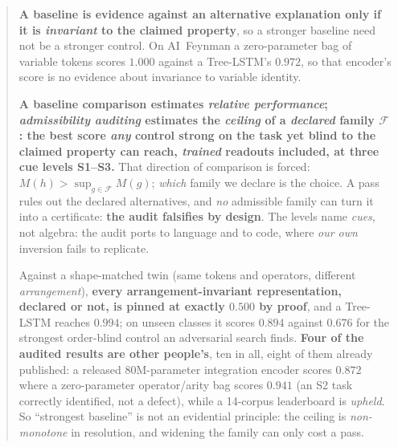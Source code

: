 \begin{abstract}
\textbf{A baseline is evidence against an alternative explanation only if it is \emph{invariant} to the claimed property}, so a stronger baseline need not be a stronger control. On AI~Feynman a zero-parameter bag of variable tokens scores $\mathbf{1.000}$ against a Tree-LSTM's $0.972$, so that encoder's score is no evidence about invariance to variable identity.

\textbf{A baseline comparison estimates \emph{relative performance}; \emph{admissibility auditing} estimates the \emph{ceiling} of a \emph{declared} family $\mathcal{F}$: the best score \emph{any} control strong on the task yet blind to the claimed property can reach, \emph{trained} readouts included, at three cue levels S1--S3.} That direction of comparison is forced: $M(h)>\sup\nolimits_{g\in\mathcal{F}}M(g)$; \emph{which} family we declare is the choice. A pass rules out the declared alternatives, and \emph{no} admissible family can turn it into a certificate: \textbf{the audit falsifies by design}. The levels name \emph{cues}, not algebra: the audit ports to language and to code, where \emph{our own} inversion fails to replicate.

Against a shape-matched twin (same tokens and operators, different \emph{arrangement}), \textbf{every arrangement-invariant representation, declared or not, is pinned at exactly $0.500$ by proof}, and a Tree-LSTM reaches $\mathbf{0.994}$; on unseen classes it scores $\mathbf{0.894}$ against $0.676$ for the strongest order-blind control an adversarial search finds. \textbf{Four of the audited results are other people's}, ten in all, eight of them already published: a released 80M-parameter integration encoder scores $0.872$ where a zero-parameter operator/arity bag scores $\mathbf{0.941}$ (an S2 task correctly identified, not a defect), while a 14-corpus leaderboard is \emph{upheld}. So ``strongest baseline'' is not an evidential principle: the ceiling is \emph{non-monotone} in resolution, and widening the family can only cost a pass.


\end{abstract}
